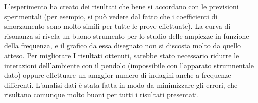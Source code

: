 L'esperimento ha creato dei risultati che bene si accordano con le previsioni sperimentali (per esempio, si può vedere dal fatto
 che i coefficienti di smorzamento sono molto simili per tutte le prove effettuate). La curva di risonanza si rivela un buono
 strumento per lo studio delle ampiezze in funzione della frequenza, e il grafico da essa disegnato non si discosta molto da quello atteso.
  Per migliorare I risultati ottenuti, sarebbe stato necessario ridurre le interazioni dell'ambiente con il pendolo (impossibile con
 l'apparato strumnentale dato) oppure effettuare un amggior numero di indagini anche a frequenze differenti.
 L'analisi dati è stata fatta in modo da minimizzare gli errori, che risultano comunque molto buoni per tutti i risultati presentati.
